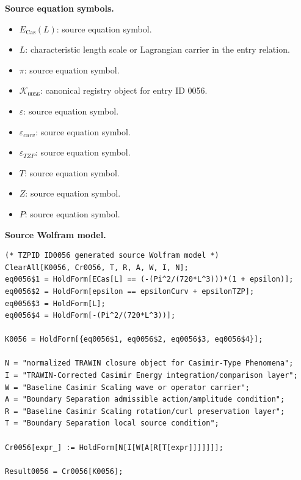 \begin{minipage}[t]{0.49\linewidth}
\begingroup
\small
\raggedright
\textbf{Source equation symbols.}\par
\begin{itemize}[leftmargin=1.35em,itemsep=1pt,topsep=1pt,parsep=0pt]
    \item $E_{\mathrm{Cas}}(L)$: source equation symbol.
    \item $L$: characteristic length scale or Lagrangian carrier in the entry relation.
    \item $\pi$: source equation symbol.
    \item $\mathcal{K}_{0056}$: canonical registry object for entry ID 0056.
    \item $\varepsilon$: source equation symbol.
    \item $\varepsilon_{curv}$: source equation symbol.
    \item $\varepsilon_{TZP}$: source equation symbol.
    \item $T$: source equation symbol.
    \item $Z$: source equation symbol.
    \item $P$: source equation symbol.
\end{itemize}
\endgroup
\end{minipage}\hfill
\begin{minipage}[t]{0.47\linewidth}
\begingroup
\scriptsize
\raggedright
\textbf{Source Wolfram model.}\par
\begin{Verbatim}[fontsize=\tiny,breaklines=true,breakanywhere=true]
(* TZPID ID0056 generated source Wolfram model *)
ClearAll[K0056, Cr0056, T, R, A, W, I, N];
eq0056$1 = HoldForm[ECas[L] == (-(Pi^2/(720*L^3)))*(1 + epsilon)];
eq0056$2 = HoldForm[epsilon == epsilonCurv + epsilonTZP];
eq0056$3 = HoldForm[L];
eq0056$4 = HoldForm[-(Pi^2/(720*L^3))];

K0056 = HoldForm[{eq0056$1, eq0056$2, eq0056$3, eq0056$4}];

N = "normalized TRAWIN closure object for Casimir-Type Phenomena";
I = "TRAWIN-Corrected Casimir Energy integration/comparison layer";
W = "Baseline Casimir Scaling wave or operator carrier";
A = "Boundary Separation admissible action/amplitude condition";
R = "Baseline Casimir Scaling rotation/curl preservation layer";
T = "Boundary Separation local source condition";

Cr0056[expr_] := HoldForm[N[I[W[A[R[T[expr]]]]]]];

Result0056 = Cr0056[K0056];
\end{Verbatim}
\endgroup
\end{minipage}

